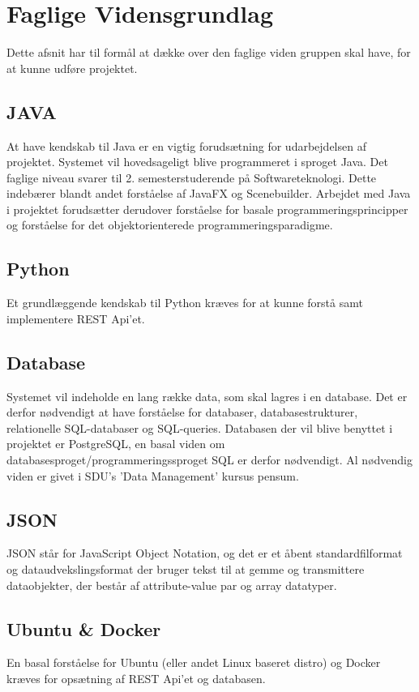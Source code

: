 \section{Faglige Vidensgrundlag}
Dette afsnit har til formål at dække over den faglige viden gruppen skal have, for at kunne udføre projektet.

\subsection{JAVA}
At have kendskab til Java er en vigtig forudsætning for udarbejdelsen af projektet. Systemet vil hovedsageligt blive programmeret i sproget Java. Det faglige niveau svarer til 2. semesterstuderende på Softwareteknologi. Dette indebærer blandt andet forståelse af JavaFX og Scenebuilder.
Arbejdet med Java i projektet forudsætter derudover forståelse for basale programmeringsprincipper og forståelse for det objektorienterede programmeringsparadigme. 

\subsection{Python}
Et grundlæggende kendskab til Python kræves for at kunne forstå samt implementere REST Api'et.

\subsection{Database}
Systemet vil indeholde en lang række data, som skal lagres i en database. Det er derfor nødvendigt at have forståelse for databaser, databasestrukturer, relationelle SQL-databaser og SQL-queries. Databasen der vil blive benyttet i projektet er PostgreSQL, en basal viden om databasesproget/programmeringssproget SQL er derfor nødvendigt. 
Al nødvendig viden er givet i SDU's 'Data Management' kursus pensum.

\subsection{JSON}
JSON står for JavaScript Object Notation, og det er et åbent standardfilformat og dataudvekslingsformat der bruger tekst til at gemme og transmittere dataobjekter, der består af attribute-value par og array datatyper.

\subsection{Ubuntu \& Docker}
En basal forståelse for Ubuntu (eller andet Linux baseret distro) og Docker kræves for opsætning af REST Api'et og databasen.

